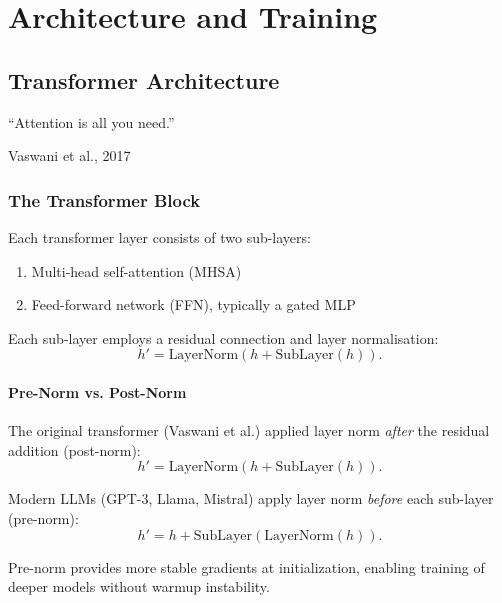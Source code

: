 \documentclass[11pt,a4paper]{book}
\theoremstyle{definition}
\begin{document}
\part{Architecture and Training}

\chapter{Transformer Architecture}
\label{ch:transformer}

\epigraph{``Attention is all you need.''}{Vaswani et al., 2017}

\section{The Transformer Block}

Each transformer layer consists of two sub-layers:
\begin{enumerate}
	\item Multi-head self-attention (MHSA)
	\item Feed-forward network (FFN), typically a gated MLP
\end{enumerate}

Each sub-layer employs a residual connection and layer normalisation:
\begin{equation}
	h' = \text{LayerNorm}(h + \text{SubLayer}(h)).
\end{equation}

\subsection{Pre-Norm vs. Post-Norm}

The original transformer (Vaswani et al.) applied layer norm \emph{after} the residual addition (post-norm):
\begin{equation}
	h' = \text{LayerNorm}(h + \text{SubLayer}(h)).
\end{equation}

Modern LLMs (GPT-3, Llama, Mistral) apply layer norm \emph{before} each sub-layer (pre-norm):
\begin{equation}
	h' = h + \text{SubLayer}(\text{LayerNorm}(h)).
\end{equation}

Pre-norm provides more stable gradients at initialization, enabling training of deeper models without warmup instability.
\end{document}

